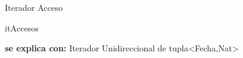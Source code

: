 \begin{interfaz}{Iterador Acceso}
\begin{iparamformales}{itAccesos}


\textbf{\large se explica con:} Iterador Unidireccional de tupla<Fecha,Nat>

\end{iparamformales}

\end{interfaz}